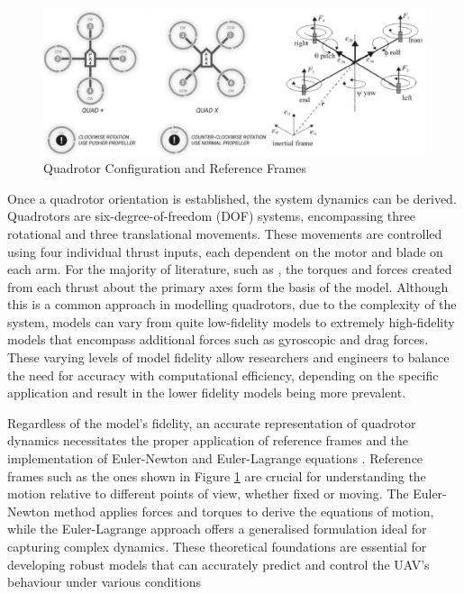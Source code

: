 \documentclass{UoNMCHA}
\numberwithin{equation}{section}
\begin{document}
\begin{figure}[H]
    \centering
    \includegraphics[width=\linewidth]{Figures/QuadrotorRefFrameandConfig.JPG}
    \caption{Quadrotor Configuration and Reference Frames}
    \label{fig:QuadrotorConfigandRef} %
\end{figure}

Once a quadrotor orientation is established, the system dynamics can be derived. Quadrotors are six-degree-of-freedom (DOF) systems, encompassing three rotational and three translational movements. These movements are controlled using four individual thrust inputs, each dependent on the motor and blade on each arm. For the majority of literature, such as {\cite{website:Quadrotorsystemmodeling}}, the torques and forces created from each thrust about the primary axes form the basis of the model. Although this is a common approach in modelling quadrotors, due to the complexity of the system, models can vary from quite low-fidelity models to extremely high-fidelity models that encompass additional forces such as gyroscopic and drag forces. These varying levels of model fidelity allow researchers and engineers to balance the need for accuracy with computational efficiency, depending on the specific application and result in the lower fidelity models being more prevalent.

Regardless of the model's fidelity, an accurate representation of quadrotor dynamics necessitates the proper application of reference frames and the implementation of Euler-Newton and Euler-Lagrange equations \cite{IntroductionToRobotics}. Reference frames such as the ones shown in Figure \ref{fig:QuadrotorConfigandRef} are crucial for understanding the motion relative to different points of view, whether fixed or moving. The Euler-Newton method applies forces and torques to derive the equations of motion, while the Euler-Lagrange approach offers a generalised formulation ideal for capturing complex dynamics. These theoretical foundations are essential for developing robust models that can accurately predict and control the UAV's behaviour under various conditions 
\end{document}

